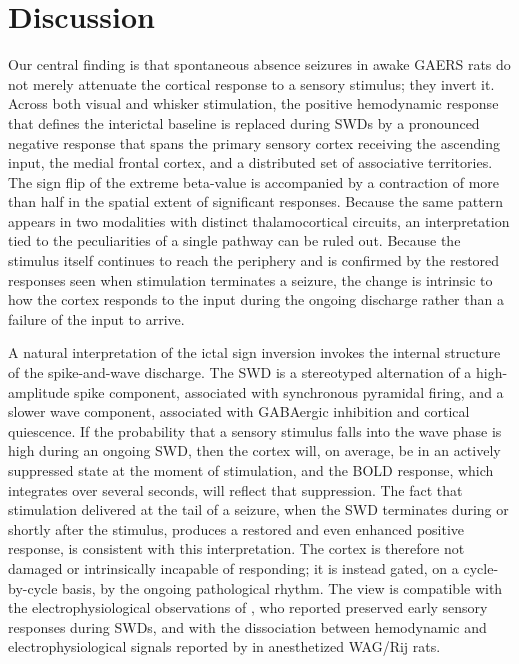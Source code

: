 \documentclass[11pt]{article}
\begin{document}
\section{Discussion}

Our central finding is that spontaneous absence seizures in awake GAERS rats do not merely attenuate the cortical response to a sensory stimulus; they invert it. Across both visual and whisker stimulation, the positive hemodynamic response that defines the interictal baseline is replaced during SWDs by a pronounced negative response that spans the primary sensory cortex receiving the ascending input, the medial frontal cortex, and a distributed set of associative territories. The sign flip of the extreme beta-value is accompanied by a contraction of more than half in the spatial extent of significant responses. Because the same pattern appears in two modalities with distinct thalamocortical circuits, an interpretation tied to the peculiarities of a single pathway can be ruled out. Because the stimulus itself continues to reach the periphery and is confirmed by the restored responses seen when stimulation terminates a seizure, the change is intrinsic to how the cortex responds to the input during the ongoing discharge rather than a failure of the input to arrive.

A natural interpretation of the ictal sign inversion invokes the internal structure of the spike-and-wave discharge. The SWD is a stereotyped alternation of a high-amplitude spike component, associated with synchronous pyramidal firing, and a slower wave component, associated with GABAergic inhibition and cortical quiescence. If the probability that a sensory stimulus falls into the wave phase is high during an ongoing SWD, then the cortex will, on average, be in an actively suppressed state at the moment of stimulation, and the BOLD response, which integrates over several seconds, will reflect that suppression. The fact that stimulation delivered at the tail of a seizure, when the SWD terminates during or shortly after the stimulus, produces a restored and even enhanced positive response, is consistent with this interpretation. The cortex is therefore not damaged or intrinsically incapable of responding; it is instead gated, on a cycle-by-cycle basis, by the ongoing pathological rhythm. The view is compatible with the electrophysiological observations of \citet{chipaux2013}, who reported preserved early sensory responses during SWDs, and with the dissociation between hemodynamic and electrophysiological signals reported by \citet{mishra2011} in anesthetized WAG/Rij rats.
\end{document}
